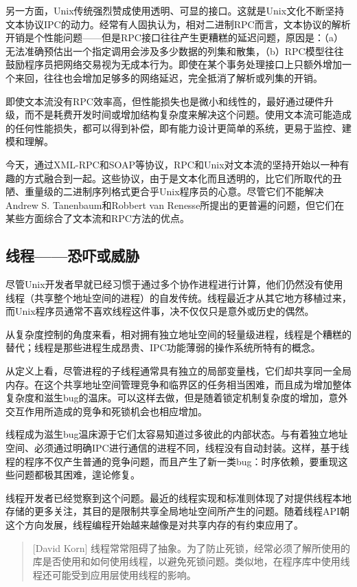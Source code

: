 \documentclass[12pt,oneside]{ctexbook}
\begin{document}
\begin{common-format}
另一方面，Unix传统强烈赞成使用透明、可显的接口。这就是Unix文化不断坚持文本协议IPC的动力。经常有人固执认为，相对二进制RPC而言，文本协议的解析开销是个性能问题——但是RPC接口往往产生更糟糕的延迟问题，原因是：（a）无法准确预估出一个指定调用会涉及多少数据的列集和散集，（b）RPC模型往往鼓励程序员把网络交易视为无成本行为。即使在某个事务处理接口上只额外增加一个来回，往往也会增加足够多的网络延迟，完全抵消了解析或列集的开销。

即使文本流没有RPC效率高，但性能损失也是微小和线性的，最好通过硬件升级，而不是耗费开发时间或增加结构复杂度来解决这个问题。使用文本流可能造成的任何性能损失，都可以得到补偿，即有能力设计更简单的系统，更易于监控、建模和理解。

今天，通过XML-RPC和SOAP等协议，RPC和Unix对文本流的坚持开始以一种有趣的方式融合到一起。这些协议，由于是文本化而且透明的，比它们所取代的丑陋、重量级的二进制序列格式更合乎Unix程序员的心意。尽管它们不能解决Andrew S. Tanenbaum和Robbert van Renesse所提出的更普遍的问题，但它们在某些方面综合了文本流和RPC方法的优点。

\subsection{线程——恐吓或威胁}
尽管Unix开发者早就已经习惯于通过多个协作进程进行计算，他们仍然没有使用线程（共享整个地址空间的进程）的自发传统。线程最近才从其它地方移植过来，而Unix程序员通常不喜欢线程这件事，决不仅仅只是意外或历史的偶然。

从复杂度控制的角度来看，相对拥有独立地址空间的轻量级进程，线程是个糟糕的替代；线程是那些进程生成昂贵、IPC功能薄弱的操作系统所特有的概念。

从定义上看，尽管进程的子线程通常具有独立的局部变量栈，它们却共享同一全局内存。在这个共享地址空间管理竞争和临界区的任务相当困难，而且成为增加整体复杂度和滋生bug的温床。可以这样去做，但是随着锁定机制复杂度的增加，意外交互作用所造成的竞争和死锁机会也相应增加。

线程成为滋生bug温床源于它们太容易知道过多彼此的内部状态。与有着独立地址空间、必须通过明确IPC进行通信的进程不同，线程没有自动封装。这样，基于线程的程序不仅产生普通的竞争问题，而且产生了新一类bug：时序依赖，要重现这些问题都极其困难，遑论修复。

线程开发者已经觉察到这个问题。最近的线程实现和标准则体现了对提供线程本地存储的更多关注，其目的是限制共享全局地址空间所产生的问题。随着线程API朝这个方向发展，线程编程开始越来越像是对共享内存的有约束应用了。

\begin{quote}[David Korn]
线程常常阻碍了抽象。为了防止死锁，经常必须了解所使用的库是否使用和如何使用线程，以避免死锁问题。类似地，在程序库中使用线程还可能受到应用层使用线程的影响。
\end{quote}


\end{common-format}
\end{document}
